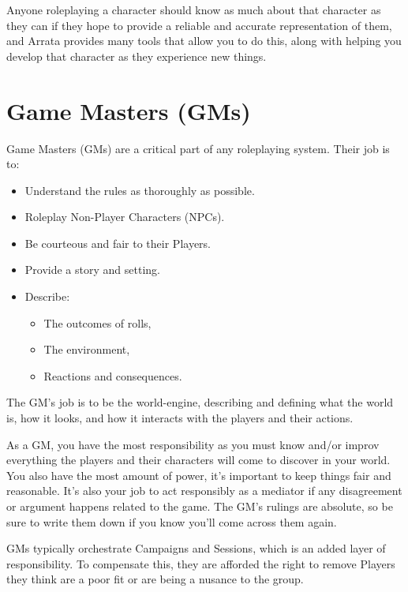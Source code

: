 \documentclass[../main.tex]{subfiles}
\begin{document}
    Anyone roleplaying a character should know as much about that character as they can if they hope to provide a reliable and accurate representation of them, and Arrata provides many tools that allow you to do this, along with helping you develop that character as they experience new things.

    \section{Game Masters (GMs)}

    Game Masters (GMs) are a critical part of any roleplaying system. Their job is to:

    \begin{itemize}
        \item Understand the rules as thoroughly as possible.
        \item Roleplay Non-Player Characters (NPCs).
        \item Be courteous and fair to their Players.
        \item Provide a story and setting.
        \item Describe:
        \begin{itemize}
            \item The outcomes of rolls,
            \item The environment,
            \item Reactions and consequences.
        \end{itemize}
    \end{itemize}
    
    The GM's job is to be the world-engine, describing and defining what the world is, how it looks, and how it interacts with the players and their actions.
    
    As a GM, you have the most responsibility as you must know and/or improv everything the players and their characters will come to discover in your world. You also have the most amount of power, it's important to keep things fair and reasonable. It's also your job to act responsibly as a mediator if any disagreement or argument happens related to the game. The GM's rulings are absolute, so be sure to write them down if you know you'll come across them again.
    
    GMs typically orchestrate Campaigns and Sessions, which is an added layer of responsibility. To compensate this, they are afforded the right to remove Players they think are a poor fit or are being a nusance to the group.
\end{document}
